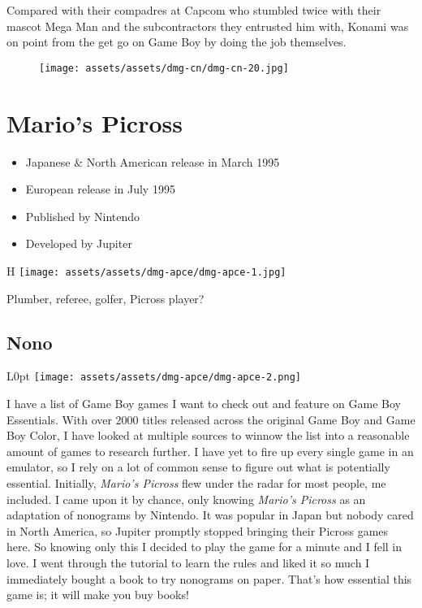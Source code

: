 \documentclass{book}
\begin{document}
Compared with their compadres at Capcom who stumbled twice with their mascot Mega Man and the subcontractors they entrusted him with, Konami was on point from the get go on Game Boy by doing the job themselves.

\begin{figure}[hbt]
\vskip 10pt
\centering \texttt{[image: assets/assets/dmg-cn/dmg-cn-20.jpg]}
\vskip 6pt
\end{figure}


\begingroup \chapter*{Mario’s Picross} \endgroup

\begin{itemize} \setlength\itemsep{-0.4em}
\item Japanese \& North American release in March 1995
\item European release in July 1995
\item Published by Nintendo
\item Developed by Jupiter
\end{itemize}\noindent

\begin{wrapfigure}{H}{\linewidth}
\vskip 4pt
\centering \texttt{[image: assets/assets/dmg-apce/dmg-apce-1.jpg]}\par\pagetwodescription Plumber, referee, golfer, Picross player?\end{wrapfigure}
\clearpage

\FloatBarrier\needspace{5pt}\section*{Nono}\nopagebreak[4]

\begin{wrapfigure}{L}{0pt} \texttt{[image: assets/assets/dmg-apce/dmg-apce-2.png]}\end{wrapfigure}
I have a list of Game Boy games I want to check out and feature on Game Boy Essentials. With over 2000 titles released across the original Game Boy and Game Boy Color, I have looked at multiple sources to winnow the list into a reasonable amount of games to research further. I have yet to fire up every single game in an emulator, so I rely on a lot of common sense to figure out what is potentially essential. Initially, \emph{Mario’s Picross} flew under the radar for most people, me included. I came upon it by chance, only knowing \emph{Mario’s Picross} as an adaptation of nonograms by Nintendo. It was popular in Japan but nobody cared in North America, so Jupiter promptly stopped bringing their Picross games here. So knowing only this I decided to play the game for a minute and I fell in love. I went through the tutorial to learn the rules and liked it so much I immediately bought a book to try nonograms on paper. That’s how essential this game is; it will make you buy books!
\end{document}
